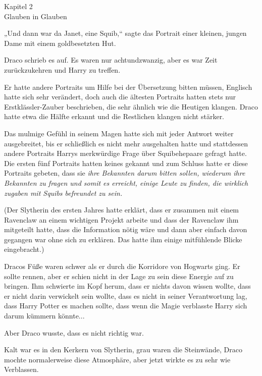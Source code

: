 

\hypertarget{glauben-in-glauben}{%

Kapitel 2\\ Glauben in Glauben

„Und dann war da Janet, eine Squib,“ sagte das Portrait einer kleinen, jungen Dame mit einem goldbesetzten Hut.

Draco schrieb es auf. Es waren nur achtundzwanzig, aber es war Zeit zurückzukehren und Harry zu treffen.

Er hatte andere Portraits um Hilfe bei der Übersetzung bitten müssen, Englisch hatte sich sehr verändert, doch auch die ältesten Portraits hatten stets nur Erstklässler-Zauber beschrieben, die sehr ähnlich wie die Heutigen klangen. Draco hatte etwa die Hälfte erkannt und die Restlichen klangen nicht stärker.

Das mulmige Gefühl in seinem Magen hatte sich mit jeder Antwort weiter ausgebreitet, bis er schließlich es nicht mehr ausgehalten hatte und stattdessen andere Portraits Harrys merkwürdige Frage über Squibehepaare gefragt hatte. Die ersten fünf Portraits hatten keines gekannt und zum Schluss hatte er diese Portraits gebeten, dass sie \emph{ihre Bekannten darum bitten sollen, wiederum \emph{ihre} Bekannten zu fragen und somit es erreicht, einige Leute zu finden, die wirklich zugaben mit Squibs befreundet zu sein.}

(Der Slytherin des ersten Jahres hatte erklärt, dass er zusammen mit einem Ravenclaw an einem wichtigen Projekt arbeite und dass der Ravenclaw ihm mitgeteilt hatte, dass die Information nötig wäre und dann aber einfach davon gegangen war ohne sich zu erklären. Das hatte ihm einige mitfühlende Blicke eingebracht.)

Dracos Füße waren schwer als er durch die Korridore von Hogwarts ging. Er sollte rennen, aber er schien nicht in der Lage zu sein diese Energie auf zu bringen. Ihm schwierte im Kopf herum, dass er nichts davon wissen wollte, dass er nicht darin verwickelt sein wollte, dass es nicht in seiner Verantwortung lag, dass Harry Potter es machen sollte, dass wenn die Magie verblasste Harry sich darum kümmern könnte...

Aber Draco wusste, dass es nicht richtig war.

Kalt war es in den Kerkern von Slytherin, grau waren die Steinwände, Draco mochte normalerweise diese Atmosphäre, aber jetzt wirkte es zu sehr wie Verblassen.

}
